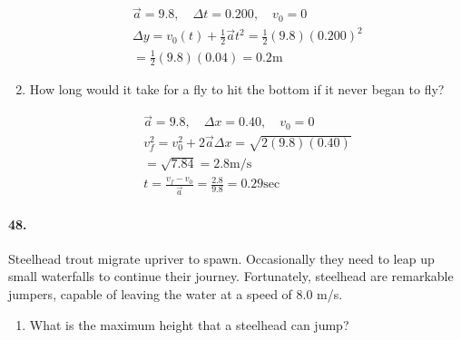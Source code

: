 \begin{multicols*}{2}
\begin{enumerate}[label=\alph*.]
            \begin{mdframed}
                \begin{equation*}
                    \begin{gathered}
                    \vec{a} = 9.8, \quad \Delta t = 0.200, \quad v_0 = 0   \\
                    \Delta y = v_0(t) + \frac{1}{2}\vec{a}t^2 = \frac{1}{2}(9.8)(0.200)^2  \\
                    = \frac{1}{2}(9.8)(0.04) = \boxed{0.2\mathrm{ m}}
                    \end{gathered}
                \end{equation*}
            \end{mdframed}

            \item How long would it take for a fly to hit the bottom if it never
            began to fly?

            \begin{mdframed}
                \begin{equation*}
                    \begin{gathered}
                        \vec{a} = 9.8, \quad \Delta x = 0.40, \quad v_0 = 0   \\
                        v_f^2 = v_0^2 + 2\vec{a}\Delta x = \sqrt{2(9.8)(0.40)}\\
                        = \sqrt{7.84} = 2.8\mathrm{ m/s} \\
                        t = \frac{v_f - v_0}{\vec{a}} = \frac{2.8}{9.8} = \boxed{0.29\mathrm{ sec}}
                    \end{gathered}
                \end{equation*}
            \end{mdframed}
        \end{enumerate}

        \paragraph*{48.}
        Steelhead trout migrate upriver to spawn. Occasionally they need to leap up small waterfalls to continue their journey. Fortunately, steelhead are remarkable jumpers, capable of leaving the water at a speed of 8.0 m/s.

        \begin{enumerate}[label=\alph*.]
            \item What is the maximum height that a steelhead can jump?
            

\end{enumerate}
\end{multicols*}
